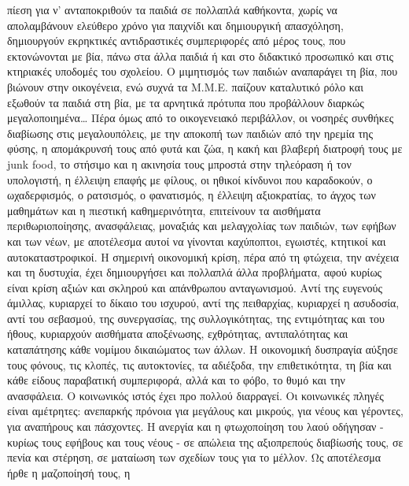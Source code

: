 \documentclass[12pt,a4paper]{book}
\begin{document}
πίεση για ν' ανταποκριθούν τα παιδιά σε πολλαπλά καθήκοντα, χωρίς να
απολαμβάνουν ελεύθερο χρόνο για παιχνίδι και δημιουργική απασχόληση, δημιουργούν
εκρηκτικές αντιδραστικές συμπεριφορές από μέρος τους, που εκτονώνονται με βία,
πάνω στα άλλα παιδιά ή και στο διδακτικό προσωπικό και στις κτηριακές υποδομές
του σχολείου.
\newline\setlength{\parindent}{40pt}\indent Ο μιμητισμός των παιδιών αναπαράγει
τη βία, που βιώνουν στην οικογένεια, ενώ συχνά τα Μ.Μ.Ε. παίζουν καταλυτικό ρόλο
και εξωθούν τα παιδιά στη βία, με τα αρνητικά πρότυπα που προβάλλουν διαρκώς
μεγαλοποιημένα\ldots
\newline\setlength{\parindent}{40pt}\indent Πέρα όμως από το οικογενειακό
περιβάλλον, οι νοσηρές συνθήκες διαβίωσης στις μεγαλουπόλεις, με την αποκοπή των
παιδιών από την ηρεμία της φύσης, η απομάκρυνσή τους από φυτά και ζώα, η κακή
και βλαβερή διατροφή τους με junk food, το στήσιμο και η ακινησία τους μπροστά
στην τηλεόραση ή τον υπολογιστή, η έλλειψη επαφής με φίλους, οι ηθικοί κίνδυνοι
που καραδοκούν, ο ωχαδερφισμός, ο ρατσισμός, ο φανατισμός, η έλλειψη
αξιοκρατίας, το άγχος των μαθημάτων και η πιεστική καθημερινότητα, επιτείνουν τα
αισθήματα περιθωριοποίησης, ανασφάλειας, μοναξιάς και μελαγχολίας των παιδιών,
των εφήβων και των νέων, με αποτέλεσμα αυτοί να γίνονται καχύποπτοι, εγωιστές,
κτητικοί και αυτοκαταστροφικοί.
\newline\setlength{\parindent}{40pt}\indent Η σημερινή οικονομική κρίση, πέρα
από τη φτώχεια, την ανέχεια και τη δυστυχία, έχει δημιουργήσει και πολλαπλά άλλα
προβλήματα, αφού κυρίως είναι κρίση αξιών και σκληρού και απάνθρωπου
ανταγωνισμού. Αντί της ευγενούς άμιλλας, κυριαρχεί το δίκαιο του ισχυρού, αντί
της πειθαρχίας, κυριαρχεί η ασυδοσία, αντί του σεβασμού, της συνεργασίας, της
συλλογικότητας, της εντιμότητας και του ήθους, κυριαρχούν αισθήματα αποξένωσης,
εχθρότητας, αντιπαλότητας και καταπάτησης κάθε νομίμου δικαιώματος των άλλων. Η
οικονομική δυσπραγία αύξησε τους φόνους, τις κλοπές, τις αυτοκτονίες, τα
αδιέξοδα, την επιθετικότητα, τη βία και κάθε είδους παραβατική συμπεριφορά, αλλά
και το φόβο, το θυμό και την ανασφάλεια.
\newline\setlength{\parindent}{40pt}\indent Ο κοινωνικός ιστός έχει προ πολλού
διαρραγεί. Οι κοινωνικές πληγές είναι αμέτρητες: ανεπαρκής πρόνοια  για μεγάλους και μικρούς, για νέους και γέροντες, για αναπήρους και πάσχοντες. Η
ανεργία και η φτωχοποίηση του λαού οδήγησαν - κυρίως τους εφήβους και τους
νέους - σε απώλεια της αξιοπρεπούς διαβίωσής τους, σε πενία και στέρηση, σε
ματαίωση των σχεδίων τους για το μέλλον. Ως αποτέλεσμα ήρθε η μαζοποίησή τους, η
\end{document}
